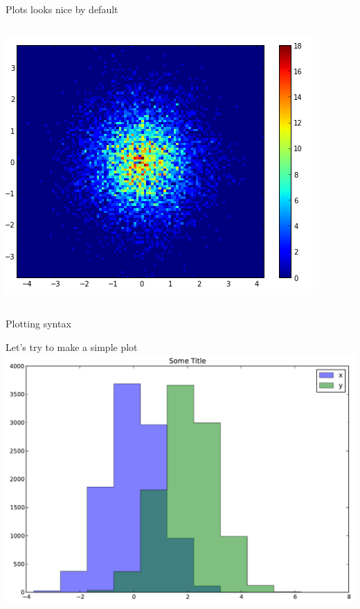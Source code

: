 \documentclass{beamer}
\begin{document}
\begin{frame}[shrink=5]{Plots looks nice by default}
\begin{columns}
\begin{column}{0.4\textwidth}
		\includegraphics[width=\textwidth]{pic/hist2d-matplotlib.png}

	\end{column}
	\end{columns}
\end{frame}
\begin{frame}{Plotting syntax}
\begin{block}{Let's try to make a simple plot}
	\includegraphics[width=\textwidth]{pic/mplsyntax.pdf}
\end{block}
\end{frame}
\end{document}
